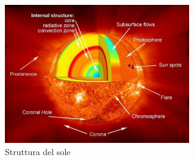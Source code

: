 \documentclass[a4paper,11pt]{article}
\begin{document}
        \\
        \begin{figure}[h!!]
            \centering
                \includegraphics[width=8cm]{2dic/StrutturaSole.jpg}
                \caption{Struttura del sole}
            \label{fig:StruttSole}
        \end{figure}
        \\
\end{document}
